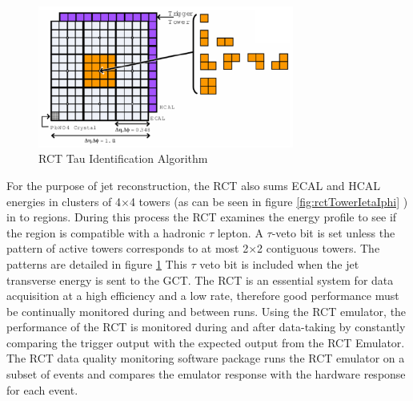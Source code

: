 \begin{figure}[hb]
  \centering
	\includegraphics[width=0.75\textwidth]{images/RCTTauAlgo.png}
  	\caption[RCT Tau ID Algorithm]
   	{RCT Tau Identification Algorithm}
	\label{fig:RCTTauAlgo}
\end{figure}
For the purpose of jet reconstruction, the RCT also sums ECAL and HCAL 
energies in clusters of 4$\times$4 towers (as can be seen in figure \ref{fig:rctTowerIetaIphi}
) in to regions. During this process the RCT examines the
energy profile to see if the region is compatible with a hadronic $\tau$ lepton.
A $\tau$-veto bit is set unless the pattern of active towers corresponds to at
most 2$\times$2 contiguous towers. The patterns are detailed in figure \ref{fig:RCTTauAlgo}
This $\tau$ veto bit is included when the jet transverse energy is sent to the GCT.
The RCT is an essential system for data acquisition at a high efficiency and
a low rate, therefore good performance must be continually monitored during and
between runs.
Using the RCT emulator, the performance of the RCT is monitored during 
and after data-taking by constantly comparing the trigger 
output with the expected output from the RCT Emulator. The RCT data quality monitoring 
software package runs the RCT emulator on a subset of events and compares
the emulator response with the hardware response for each event.


